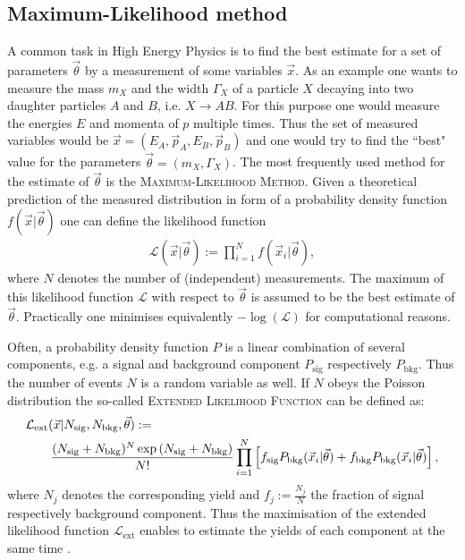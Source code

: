 \subsection{Maximum-Likelihood method}
A common task in High Energy Physics is to find the best estimate for a set of parameters $\vec{\theta}$ by a measurement of some variables $\vec{x}$.
As an example one wants to measure the mass $m_X$  and the width $\Gamma_X$ of a particle $X$ decaying into two daughter particles $A$ and $B$, i.e. $X \to AB$.
For this purpose one would measure the energies $E$ and momenta of $p$ multiple times.
Thus the set of measured variables would be $\vec{x} = (E_A, \vec{p}_A, E_B, \vec{p}_B)$ and one would try to find the ``best" value for the parameters $\vec{\theta} = (m_X, \Gamma_X)$. 
The most frequently used method for the estimate of $\vec{\theta}$ is the \textsc{Maximum-Likelihood Method}.
Given a theoretical prediction of the measured distribution in form of a probability density function $f(\vec{x}|\vec{\theta})$ one can define the likelihood function
\begin{align}
    \mathcal{L}(\vec{x}|\vec{\theta}) := \prod_{i=1}^{N} f(\vec{x}_i|\vec{\theta}),
\end{align}
where $N$ denotes the number of (independent) measurements.
The maximum of this likelihood function $\mathcal{L}$ with respect to $\vec{\theta}$ is assumed to be the best estimate of $\vec{\theta}$.
Practically one minimises equivalently $-\log(\mathcal{L})$ for computational reasons.

Often, a probability density function $P$ is a linear combination of several components, e.g. a signal and background component $P_\text{sig}$ respectively $P_\text{bkg}$.
Thus the number of events $N$ is a random variable as well.
If $N$ obeys the Poisson distribution the so-called \textsc{Extended Likelihood Function} can be defined as: 
\begin{align}
    &\mathcal{L}_\text{ext}(\vec{x} | \Nsig, \Nbkg, \vec{\theta}) :=  \nonumber \\ 
    &\qquad \frac{(\Nsig+\Nbkg)^N\exp{(\Nsig+\Nbkg)}}{N!} \prod_{i=1}^{N} \left[f_\text{sig}P_\text{bkg}(\vec{x}_i|\vec{\theta}) + f_\text{bkg}P_\text{bkg}(\vec{x}_i|\vec{\theta})\right],
\end{align} 
where $N_j$ denotes the corresponding yield and $f_j:=\frac{N_j}{N}$ the fraction of signal respectively background component.
Thus the maximisation of the extended likelihood function $\mathcal{L}_\text{ext}$ enables to estimate the yields of each component at the same time \cite{Lista_Statistics, PDG}.

